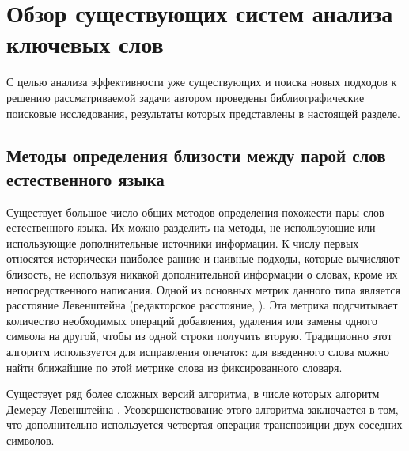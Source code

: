 \chapter{Обзор существующих систем анализа ключевых слов} \label{chapt1}

С целью анализа эффективности уже существующих и поиска новых подходов к решению рассматриваемой задачи автором проведены библиографические поисковые исследования, результаты которых представлены в настоящей разделе. 

\section{Методы определения близости между парой слов естественного языка}


Существует большое число общих методов определения похожести пары слов естественного языка. Их можно разделить на методы, не использующие или использующие дополнительные источники информации. К числу первых относятся исторически наиболее ранние и наивные подходы, которые вычисляют близость, не используя никакой дополнительной информации о словах, кроме их непосредственного написания. Одной из основных метрик данного типа является расстояние Левенштейна  (редакторское расстояние, \cite{leven}). Эта метрика подсчитывает количество необходимых операций добавления, удаления или замены одного символа на другой, чтобы из одной строки получить вторую. Традиционно этот алгоритм используется для исправления опечаток: для введенного слова можно найти ближайшие по этой метрике слова из фиксированного словаря. 

Существует ряд более сложных версий алгоритма, в числе которых алгоритм Демерау-Левенштейна \cite{leven_dem}. Усовершенствование этого алгоритма заключается в том, что дополнительно используется четвертая операция транспозиции двух соседних символов.

